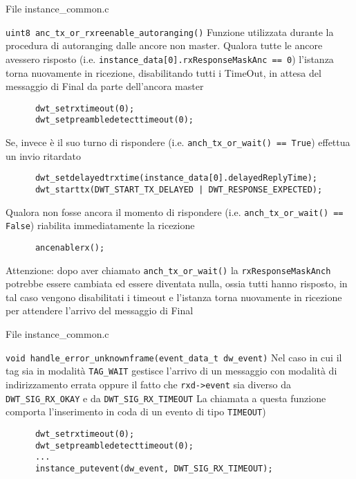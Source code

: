 \begin{frame}[fragile,shrink=30]{File instance\_common.c}
  \begin{block}{\lstinline!uint8 anc_tx_or_rxreenable_autoranging()!}
    Funzione utilizzata durante la procedura di autoranging dalle ancore non master.
    Qualora tutte le ancore avessero risposto (i.e. \lstinline!instance_data[0].rxResponseMaskAnc == 0!) l'istanza torna nuovamente in ricezione, disabilitando tutti i
    TimeOut, in attesa del messaggio di Final da parte dell'ancora master 
    \begin{lstlisting}
      dwt_setrxtimeout(0);
      dwt_setpreambledetecttimeout(0);
    \end{lstlisting}
    Se, invece è il suo turno di rispondere (i.e. \lstinline!anch_tx_or_wait() == True!) effettua un invio ritardato
    \begin{lstlisting}
      dwt_setdelayedtrxtime(instance_data[0].delayedReplyTime);
      dwt_starttx(DWT_START_TX_DELAYED | DWT_RESPONSE_EXPECTED);
    \end{lstlisting}
    Qualora non fosse ancora il momento di rispondere (i.e. \lstinline!anch_tx_or_wait() == False!) riabilita immediatamente la ricezione
    \begin{lstlisting}
      ancenablerx();
    \end{lstlisting}    
    \textcolor{dgreen}{Attenzione:} dopo aver chiamato \lstinline!anch_tx_or_wait()! la \lstinline!rxResponseMaskAnch! potrebbe essere cambiata ed essere diventata
    nulla, ossia tutti hanno risposto, in tal caso vengono disabilitati i timeout e l'istanza torna nuovamente in ricezione per attendere l'arrivo del messaggio di Final
  \end{block}
\end{frame}

\begin{frame}[fragile]{File instance\_common.c}
  \begin{block}{\lstinline!void handle_error_unknownframe(event_data_t dw_event)!}
    Nel caso in cui il tag sia in modalità \lstinline!TAG_WAIT! gestisce l'arrivo di un messaggio con modalità di indirizzamento
    errata oppure il fatto che \lstinline!rxd->event! sia diverso da \lstinline!DWT_SIG_RX_OKAY! e da \lstinline!DWT_SIG_RX_TIMEOUT!
    La chiamata a questa funzione comporta l'inserimento in coda di un evento di tipo \lstinline!TIMEOUT!)
    \begin{lstlisting}
      dwt_setrxtimeout(0);
      dwt_setpreambledetecttimeout(0);
      ...
      instance_putevent(dw_event, DWT_SIG_RX_TIMEOUT);
    \end{lstlisting}
  \end{block}
\end{frame}

